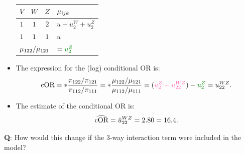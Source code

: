 \documentclass[oneside]{book}\usepackage[]{graphicx}\usepackage[svgnames]{xcolor}
\let\exp\relax%
\let\log\relax%
\newcommand{\cOR}{\text{cOR}}%
\begin{document}
\begin{itemize}
          \begin{table}[H]
              \centering
              \begin{tabular}{cccl}
                  $ V $                                           & $ W $                       & $ Z $ & $ \log{\mu_{ijk}} $ \\
                  \midrule
                  $1$                                             & $1$                         & $2$   & $ u+u_2^W+u_2^Z $   \\
                  $1$                                             & $1$                         & $1$   & $ u $               \\
                  \midrule
                  \multicolumn{3}{c}{$\log{\mu_{122}/\mu_{121}}$} & $=\textcolor{Green}{u_2^Z}$
              \end{tabular}
          \end{table}
    \item The expression for the (log) conditional OR is:
          \[ \log{\cOR}=\log*{\frac{\pi_{122}/\pi_{121}}{\pi_{112}/\pi_{111}}}=\log*{\frac{\mu_{122}/\mu_{121}}{\mu_{112}/\mu_{111}}}=(\textcolor{HotPink}{u_2^Z+u_{22}^{WZ}})-\textcolor{Green}{u_2^Z}=u_{22}^{WZ}. \]
    \item The estimate of the conditional OR is:
          \[ \widehat{\cOR}=\exp{\hat{u}_{22}^{WZ}}=\exp{2.80}=16.4. \]
\end{itemize}
\begin{Example}{}
    \textbf{Q}: How would this change if the 3-way interaction term were included in the model?
\end{Example}
\end{document}
